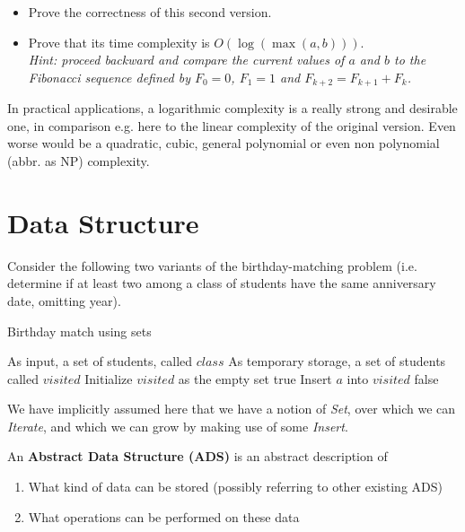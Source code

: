 \documentclass[12pt]{article}
\theoremstyle{plain}
\theoremstyle{remark}
\begin{document}
\begin{itemize}
\item Prove the correctness of this second version.
\item Prove that its time complexity is $O(\log(\max(a, b)))$.\\{\it Hint:
	proceed backward and compare the current values of $a$ and $b$ to the
		Fibonacci sequence defined by $F_0=0$, $F_1=1$ and $F_{k+2} =
		F_{k+1} + F_{k}$.}
\end{itemize}

In practical applications, a logarithmic complexity is a really strong 
and desirable one, in comparison e.g. here to the linear complexity of 
the original version. Even worse would be a quadratic, cubic, general polynomial
or even non polynomial (abbr. as NP) complexity.

\section{Data Structure}

Consider the following two variants of the birthday-matching problem (i.e.
determine if at least two among a class of students have the same anniversary
date, omitting year).

\begin{algorithm}[H]
\caption{Birthday match using sets}
\begin{algorithmic}
\Require As input, a set of students, called $class$
\Require As temporary storage, a set of students called $visited$
\State Initialize $visited$ as the empty set
\State \Return true
\EndIf
\EndFor
\State Insert $a$ into $visited$
\EndFor
\State \Return false
\end{algorithmic}
\end{algorithm}

We have implicitly assumed here that we have a notion of {\it Set}, over which we can
{\it Iterate}, and which we can grow by making use of some {\it Insert}.

\medskip

An {\bf Abstract Data Structure (ADS)} is an abstract description of 
\begin{enumerate}
\item What kind of data can be stored (possibly referring to other existing ADS)
\item What operations can be performed on these data
\end{enumerate}
\end{document}

